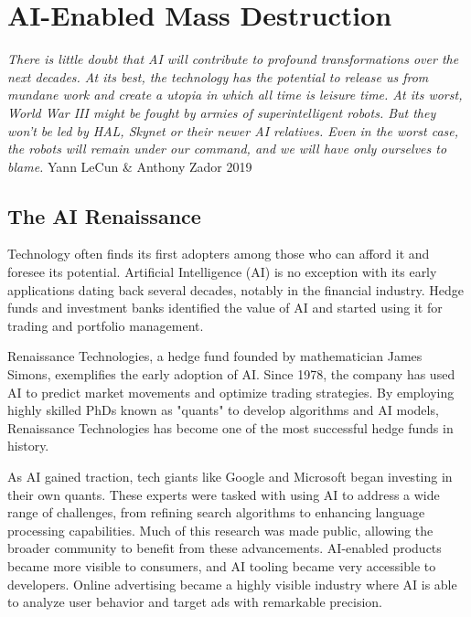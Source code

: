 \setchapterpreamble[u]{\margintoc}
\chapter{AI-Enabled Mass Destruction}

\textit{There is little doubt that AI will contribute to profound transformations over the next decades. At its best, the technology has the potential to release us from mundane work and create a utopia in which all time is leisure time. At its worst, World War III might be fought by armies of superintelligent robots. But they won't be led by HAL, Skynet or their newer AI relatives. Even in the worst case, the robots will remain under our command, and we will have only ourselves to blame.} Yann LeCun \& Anthony Zador 2019 \cite{dontfearterminator}


\section{The AI Renaissance}

Technology often finds its first adopters among those who can afford it and foresee its potential. Artificial Intelligence (AI) is no exception with its early applications dating back several decades, notably in the financial industry. Hedge funds and investment banks identified the value of AI and started using it for trading and portfolio management.

Renaissance Technologies, a hedge fund founded by mathematician James Simons, exemplifies the early adoption of AI. Since 1978, the company has used AI to predict market movements and optimize trading strategies. By employing highly skilled PhDs known as "quants" to develop algorithms and AI models, Renaissance Technologies has become one of the most successful hedge funds in history.

As AI gained traction, tech giants like Google and Microsoft began investing in their own quants. These experts were tasked with using AI to address a wide range of challenges, from refining search algorithms to enhancing language processing capabilities. Much of this research was made public, allowing the broader community to benefit from these advancements. AI-enabled products became more visible to consumers, and AI tooling became very accessible to developers. Online advertising became a highly visible industry where AI is able to analyze user behavior and target ads with remarkable precision.

